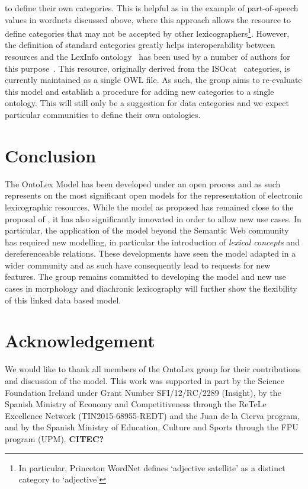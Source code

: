 \documentclass[12pt,a4paper]{elex2017}
\begin{document}
\begin{description}
        to define their own categories. This is helpful as in the example
        of part-of-speech values in wordnets discussed above, where this
        approach allows the resource to define categories that may not be
        accepted by other lexicographers\footnote{In particular, Princeton
        WordNet defines `adjective satellite' as a distinct category to
        `adjective'}. However, the definition of standard categories greatly
        helps interoperability between resources and the LexInfo
        ontology~\citep{cimiano2011lexinfo} has been used by a number of authors
        for this
        purpose~\citep{buitelaar2013linguistic,villegas2015parole,serasset2015dbnary}. 
        This resource, originally derived from the
        ISOcat~\citep{kemps2008isocat} categories, is currently maintained as a
        single OWL file. As such, the group aims to re-evaluate this model and
        establish a procedure for adding new categories to a single
        ontology. This will still only be a suggestion for data categories
        and we expect particular communities to define their own ontologies.
\end{description}

\section{Conclusion}

The OntoLex Model has been developed under an open process and as such
represents on the most significant open models for the representation of
electronic lexicographic resources. While the model as proposed has remained
close to the proposal of \cite{mccrae2012interchanging}, it has also
significantly innovated in order to allow new use cases. In particular, the
application of the model beyond the Semantic Web community has required new
modelling, in particular the introduction of \emph{lexical concepts} and
dereferenceable relations. These developments have seen the model adapted in a
wider community and as such have consequently lead to requests for new features.
The group remains committed to developing the model and new use cases in
morphology and diachronic lexicography will further show the flexibility of this
linked data based model.

\section*{Acknowledgement} 

We would like to thank all members of the OntoLex group for their contributions
and discussion of the model. This work was supported in part by the Science Foundation Ireland under Grant
Number SFI/12/RC/2289 (Insight), by the Spanish Ministry of Economy and 
Competitiveness through the ReTeLe Excellence Network (TIN2015-68955-REDT)
 and the Juan de la Cierva program, and by the Spanish Ministry of Education, 
 Culture and Sports through the FPU program (UPM). \textbf{CITEC?} 
\end{document}

